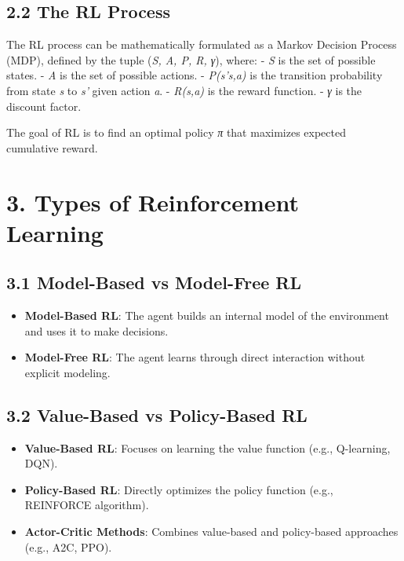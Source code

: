 \documentclass[
]{book}
\providecommand{\tightlist}{%
  \setlength{\itemsep}{0pt}\setlength{\parskip}{0pt}}
\begin{document}
\subsection{\texorpdfstring{\textbf{2.2 The RL Process}}{2.2 The RL Process}}\label{the-rl-process}

The RL process can be mathematically formulated as a Markov Decision Process (MDP), defined by the tuple (\emph{S, A, P, R, γ}), where:
- \emph{S} is the set of possible states.
- \emph{A} is the set of possible actions.
- \emph{P(s'\textbar s,a)} is the transition probability from state \emph{s} to \emph{s'} given action \emph{a}.
- \emph{R(s,a)} is the reward function.
- \emph{γ} is the discount factor.

The goal of RL is to find an optimal policy \emph{π} that maximizes expected cumulative reward.

\section{\texorpdfstring{\textbf{3. Types of Reinforcement Learning}}{3. Types of Reinforcement Learning}}\label{types-of-reinforcement-learning}

\subsection{\texorpdfstring{\textbf{3.1 Model-Based vs Model-Free RL}}{3.1 Model-Based vs Model-Free RL}}\label{model-based-vs-model-free-rl}

\begin{itemize}
\tightlist
\item
  \textbf{Model-Based RL}: The agent builds an internal model of the environment and uses it to make decisions.
\item
  \textbf{Model-Free RL}: The agent learns through direct interaction without explicit modeling.
\end{itemize}

\subsection{\texorpdfstring{\textbf{3.2 Value-Based vs Policy-Based RL}}{3.2 Value-Based vs Policy-Based RL}}\label{value-based-vs-policy-based-rl}

\begin{itemize}
\tightlist
\item
  \textbf{Value-Based RL}: Focuses on learning the value function (e.g., Q-learning, DQN).
\item
  \textbf{Policy-Based RL}: Directly optimizes the policy function (e.g., REINFORCE algorithm).
\item
  \textbf{Actor-Critic Methods}: Combines value-based and policy-based approaches (e.g., A2C, PPO).
\end{itemize}
\end{document}
